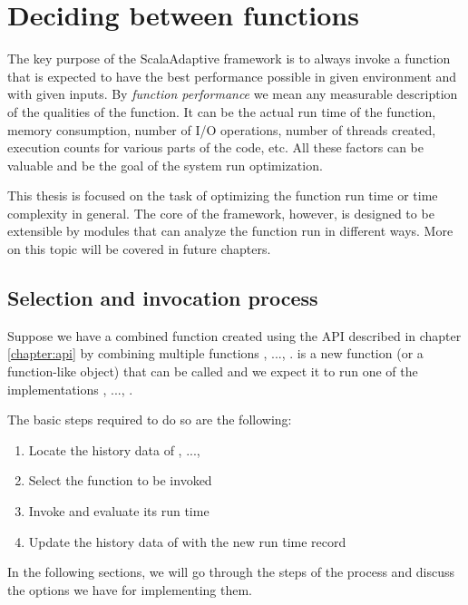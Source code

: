\chapter{Deciding between functions}
\label{chap:deciding}

The key purpose of the ScalaAdaptive framework is to always invoke a function that is expected to have the best performance possible in given environment and with given inputs. By \textit{function performance} we mean any measurable description of the qualities of the function. It can be the actual run time of the function, memory consumption, number of I/O operations, number of threads created, execution counts for various parts of the code, etc. All these factors can be valuable and be the goal of the system run optimization.

This thesis is focused on the task of optimizing the function run time or time complexity in general. The core of the framework, however, is designed to be extensible by modules that can analyze the function run in different ways. More on this topic will be covered in future chapters. %

\section{Selection and invocation process}
\label{sec:selection_and_invocation_process}

Suppose we have a combined function  created using the API described in chapter \ref{chapter:api} by combining multiple functions , ..., .  is a new function (or a function-like object) that can be called and we expect it to run one of the implementations , ..., .

The basic steps required to do so are the following:

\begin{enumerate}
	\item Locate the history data of , ..., 
	\item Select the function  to be invoked
	\item Invoke  and evaluate its run time
	\item Update the history data of  with the new run time record
\end{enumerate}

In the following sections, we will go through the steps of the process and discuss the options we have for implementing them.

